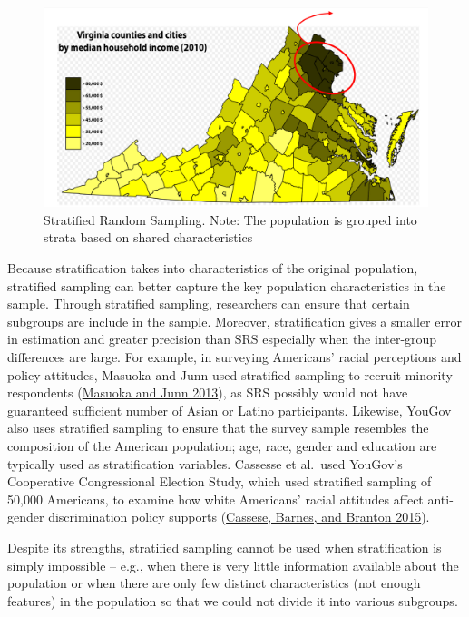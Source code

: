 \documentclass{book}
\begin{document}
\begin{figure}
\hypertarget{fig:stratified-random-sampling}{%
\centering
\includegraphics{images/surveys/Virginia_sampling.png}
\caption{Stratified Random Sampling. Note: The population is grouped into
strata based on shared characteristics}\label{fig:stratified-random-sampling}
}
\end{figure}

Because stratification takes into characteristics of the original population,
stratified sampling can better capture the key population characteristics in
the sample. Through stratified sampling, researchers can ensure that certain
subgroups are include in the sample. Moreover, stratification gives a smaller
error in estimation and greater precision than SRS especially when the
inter-group differences are large. For example, in surveying Americans' racial
perceptions and policy attitudes, Masuoka and Junn used stratified sampling to
recruit minority respondents
(\protect\hyperlink{ref-masuoka2013politics}{Masuoka and Junn 2013}), as SRS
possibly would not have guaranteed sufficient number of Asian or Latino
participants. Likewise, YouGov also uses stratified sampling to ensure that
the survey sample resembles the composition of the American population; age,
race, gender and education are typically used as stratification variables.
Cassesse et al.~used YouGov's Cooperative Congressional Election Study, which
used stratified sampling of 50,000 Americans, to examine how white Americans'
racial attitudes affect anti-gender discrimination policy supports
(\protect\hyperlink{ref-cassese2015racializing}{Cassese, Barnes, and Branton
2015}).

Despite its strengths, stratified sampling cannot be used when stratification
is simply impossible -- e.g., when there is very little information available
about the population or when there are only few distinct characteristics (not
enough features) in the population so that we could not divide it into various
subgroups.
\end{document}
